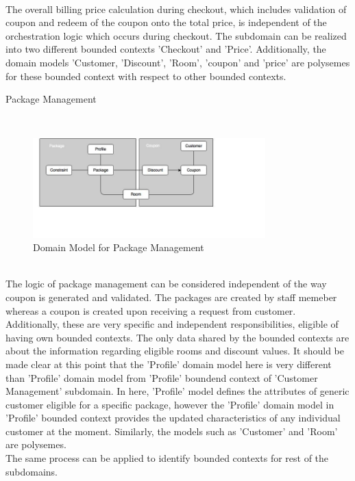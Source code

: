 \\
The overall billing price calculation during checkout, which includes validation of coupon and redeem of the coupon onto the total price, is independent of the orchestration logic which occurs during checkout. The subdomain can be realized into two different bounded contexts 'Checkout' and 'Price'. Additionally, the domain models 'Customer, 'Discount', 'Room', 'coupon' and 'price' are polysemes for these bounded context with respect to other bounded contexts.\\
\begin{shaded} Package Management \end{shaded}
\\
\begin{figure}[H]
\begin{center}
\includegraphics[width=0.8\textwidth]{figures/domain-driven-design-five}
\caption{Domain Model for Package Management}
\label{fig:domain_driven_design/example_scenario/subdomains/package-management}
\end{center}
\end{figure}
\\
The logic of package management can be considered independent of the way coupon is generated and validated. The packages are created by staff memeber whereas a coupon is created upon receiving a request from customer. Additionally, these are very specific and independent responsibilities, eligible of having own bounded contexts. The only data shared by the bounded contexts are about the information regarding eligible rooms and discount values. It should be made clear at this point that the 'Profile' domain model here is very different than 'Profile' domain model from 'Profile' boundend context of 'Customer Management' subdomain. In here, 'Profile' model defines the attributes of generic customer eligible for a specific package, however the 'Profile' domain model in 'Profile' bounded context provides the updated characteristics of any individual customer at the moment. Similarly, the models such as 'Customer' and 'Room' are polysemes.\\
The same process can be applied to identify bounded contexts for rest of the subdomains.

